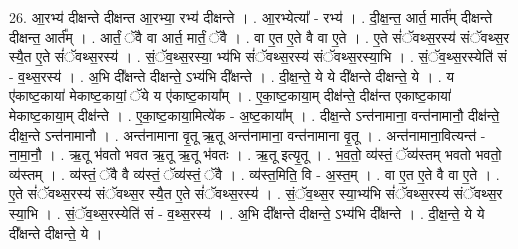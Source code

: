 \documentclass[17pt]{extarticle}
\begin{document}
26. आ॒रभ्य॑ दीक्षन्ते दीक्षन्त आ॒रभ्या॒ रभ्य॑ दीक्षन्ते । . आ॒रभ्येत्या᳚ - रभ्य॑ । . दी॒क्ष॒न्त॒ आर्त॒ मार्त॑म् दीक्षन्ते दीक्षन्त॒ आर्त᳚म् । . आर्तं॒ ॅवै वा आर्त॒ मार्तं॒ ॅवै । . वा ए॒त ए॒ते वै वा ए॒ते । . ए॒ते सं॑ॅवथ्स॒रस्य॑ संॅवथ्स॒र स्यै॒त ए॒ते सं॑ॅवथ्स॒रस्य॑ । . सं॒ॅव॒थ्स॒रस्या॒ भ्य॑भि सं॑ॅवथ्स॒रस्य॑ संॅवथ्स॒रस्या॒भि । . सं॒ॅव॒थ्स॒रस्येति॑ सं - व॒थ्स॒रस्य॑ । . अ॒भि दी᳚क्षन्ते दीक्षन्ते॒ ऽभ्य॑भि दी᳚क्षन्ते । . दी॒क्ष॒न्ते॒ ये ये दी᳚क्षन्ते दीक्षन्ते॒ ये । . य ए॑काष्ट॒काया॑ मेकाष्ट॒कायां॒ ॅये य ए॑काष्ट॒काया᳚म् । . ए॒का॒ष्ट॒काया॒म् दीक्ष॑न्ते॒ दीक्ष॑न्त एकाष्ट॒काया॑ मेकाष्ट॒काया॒म् दीक्ष॑न्ते । . ए॒का॒ष्ट॒काया॒मित्ये॑क - अ॒ष्ट॒काया᳚म् । . दीक्ष॒न्ते ऽन्त॑नामाना॒ वन्त॑नामानौ॒ दीक्ष॑न्ते॒ दीक्ष॒न्ते ऽन्त॑नामानौ । . अन्त॑नामाना वृ॒तू ऋ॒तू अन्त॑नामाना॒ वन्त॑नामाना वृ॒तू । . अन्त॑नामाना॒वित्यन्त॑ - ना॒मा॒नौ॒ । . ऋ॒तू भ॑वतो भवत ऋ॒तू ऋ॒तू भ॑वतः । . ऋ॒तू इत्यृ॒तू । . भ॒व॒तो॒ व्य॑स्तं॒ ॅव्य॑स्तम् भवतो भवतो॒ व्य॑स्तम् । . व्य॑स्तं॒ ॅवै वै व्य॑स्तं॒ ॅव्य॑स्तं॒ ॅवै । . व्य॑स्त॒मिति॒ वि - अ॒स्त॒म् । . वा ए॒त ए॒ते वै वा ए॒ते । . ए॒ते सं॑ॅवथ्स॒रस्य॑ संॅवथ्स॒र स्यै॒त ए॒ते सं॑ॅवथ्स॒रस्य॑ । . सं॒ॅव॒थ्स॒र स्या॒भ्य॑भि सं॑ॅवथ्स॒रस्य॑ संॅवथ्स॒र स्या॒भि । . सं॒ॅव॒थ्स॒रस्येति॑ सं - व॒थ्स॒रस्य॑ । . अ॒भि दी᳚क्षन्ते दीक्षन्ते॒ ऽभ्य॑भि दी᳚क्षन्ते । . दी॒क्ष॒न्ते॒ ये ये दी᳚क्षन्ते दीक्षन्ते॒ ये । \newline
\end{document}
